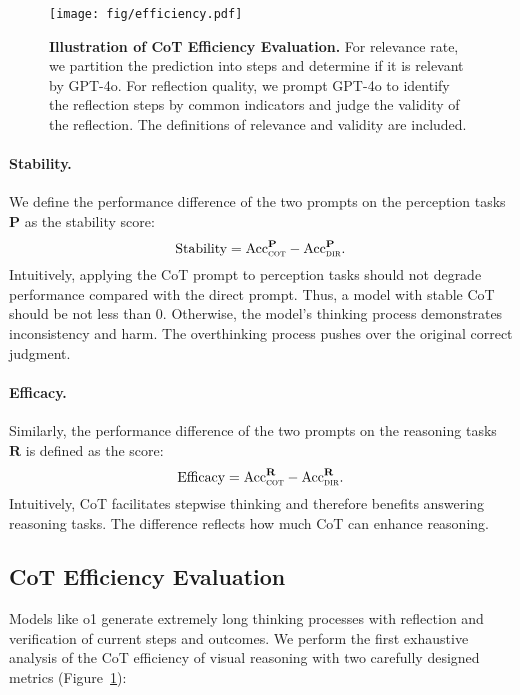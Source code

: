 \begin{figure}[t]
\begin{center}
\centerline{\texttt{[image: fig/efficiency.pdf]}}
\caption{\textbf{Illustration of CoT Efficiency Evaluation.} For relevance rate, we partition the prediction into steps and determine if it is relevant by GPT-4o. For reflection quality, we prompt GPT-4o to identify the reflection steps by common indicators and judge the validity of the reflection. The definitions of relevance and validity are included.}
\label{fig:efficiency}
\end{center}
\vskip -0.2in
\end{figure}

\vspace{-1em}
\paragraph{Stability.}
We define the performance difference of the two prompts on the perception tasks $\mathbf{P}$ as the stability score:
\begin{equation}
    \text{Stability} = \text{Acc}^{\mathbf{P}}_{\textsc{cot}} - \text{Acc}^{\mathbf{P}}_{\textsc{dir}}.
\end{equation}
Intuitively, applying the CoT prompt to perception tasks should not degrade performance compared with the direct prompt. Thus, a model with stable CoT should be not less than 0. Otherwise, the model's thinking process demonstrates inconsistency and harm. The overthinking process pushes over the original correct judgment.

\vspace{-1em}
\paragraph{Efficacy.}
Similarly, the performance difference of the two prompts on the reasoning tasks $\mathbf{R}$ is defined as the score:
\begin{equation}
    \text{Efficacy} = \text{Acc}^{\mathbf{R}}_{\textsc{cot}} - \text{Acc}^{\mathbf{R}}_{\textsc{dir}}.
\end{equation}
Intuitively, CoT facilitates stepwise thinking and therefore benefits answering reasoning tasks. The difference reflects how much CoT can enhance reasoning.




\subsection{CoT Efficiency Evaluation}
\label{sec2_evaluation_reflection}
Models like o1 generate extremely long thinking processes with reflection and verification of current steps and outcomes. We perform the first exhaustive analysis of the CoT efficiency of visual reasoning with two carefully designed metrics (Figure~\ref{fig:efficiency}):
